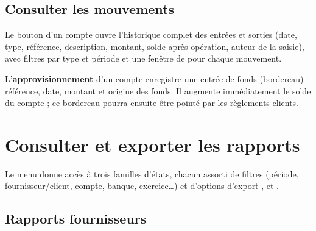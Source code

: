 \subsection{Consulter les mouvements}

Le bouton  d'un compte ouvre l'historique complet des entrées et sorties (date, type, référence, description, montant, solde après opération, auteur de la saisie), avec filtres par type et période et une fenêtre de  pour chaque mouvement.


L'\textbf{approvisionnement} d'un compte enregistre une entrée de fonds (bordereau)~: référence, date, montant et origine des fonds. Il augmente immédiatement le solde du compte ; ce bordereau pourra ensuite être pointé par les règlements clients.

\section{Consulter et exporter les rapports}

Le menu  donne accès à trois familles d'états, chacun assorti de filtres (période, fournisseur/client, compte, banque, exercice\ldots) et d'options d'export ,  et .

\subsection{Rapports fournisseurs}

